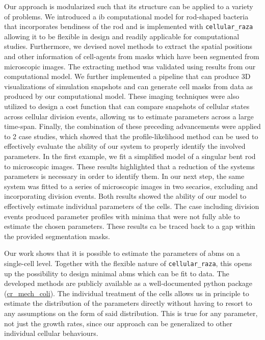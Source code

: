 \documentclass[10pt,letterpaper]{article}
\begin{document}
Our approach is modularized such that its structure can be applied to a variety of problems.
We introduced a \ac{ib} computational model for rod-shaped bacteria that incorporates bendiness of
the rod and is implemented with \texttt{cellular\_raza} allowing it to be flexible in design and
readily applicable for computational studies.
Furthermore, we devised novel methods to extract the spatial positions and other information of
cell-agents from masks which have been segmented from microscopic images.
The extracting method was validated using results from our computational model.
We further implemented a pipeline that can produce 3D visualizations of simulation snapshots and can
generate cell masks from data as produced by our computational model.
These imaging techniques were also utilized to design a cost function that can compare snapshots
of cellular states across cellular division events, allowing us to estimate parameters across a
large time-span.
Finally, the combination of these preceding advancements were applied to 2 case studies, which showed
that the profile-likelihood method can be used to effectively evaluate the ability of our system to
properly identify the involved parameters.
In the first example, we fit a simplified model of a singular bent rod to microscopic images.
These results highlighted that a reduction of the systems parameters is necessary in order to
identify them.
In our next step, the same system was fitted to a series of microscopic images in two secarios,
excluding and incorporating division events.
Both results showed the ability of our model to effectively estimate individual parameters of the
cells.
The case including division events produced parameter profiles with minima that were not fully able
to estimate the chosen parameters.
These results ca be traced back to a gap within the provided segmentation masks.

Our work shows that it is possible to estimate the parameters of \acp{abm} on a single-cell level.
Together with the flexible nature of \texttt{cellular\_raza}, this opens up the possibility to
design minimal \acp{abm} which can be fit to data.
The developed methods are publicly available as a well-documented python package
(\href{https://github.com/jonaspleyer/cr_mech_coli}{cr\_mech\_coli}).
The individual treatment of the cells allows us in principle to estimate the distribution of the
parameters directly without having to resort to any assumptions on the form of said distribution.
This is true for any parameter, not just the growth rates, since our approach can be generalized to
other individual cellular behaviours.
\end{document}
